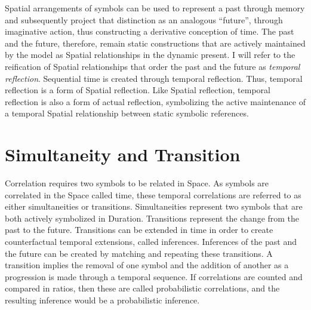 Spatial arrangements of symbols can be used to represent a past
through memory and subsequently project that distinction as an
analogous ``future'', through imaginative action, thus constructing a
derivative conception of time.  The past and the future, therefore,
remain static constructions that are actively maintained by the model
as Spatial relationships in the dynamic present.  I will refer to the
reification of Spatial relationships that order the past and the
future as \emph{temporal reflection}.  Sequential time is created
through temporal reflection.  Thus, temporal reflection is a form of
Spatial reflection.  Like Spatial reflection, temporal reflection is
also a form of actual reflection, symbolizing the active maintenance
of a temporal Spatial relationship between static symbolic references.

\section{Simultaneity and Transition}

Correlation requires two symbols to be related in Space.  As symbols
are correlated in the Space called time, these temporal correlations
are referred to as either simultaneities or transitions.
Simultaneities represent two symbols that are both actively symbolized
in Duration.  Transitions represent the change from the past to the
future.  Transitions can be extended in time in order to create
counterfactual temporal extensions, called inferences.  Inferences of
the past and the future can be created by matching and repeating these
transitions.  A transition implies the removal of one symbol and the
addition of another as a progression is made through a temporal
sequence.  If correlations are counted and compared in ratios, then
these are called probabilistic correlations, and the resulting
inference would be a probabilistic inference.


